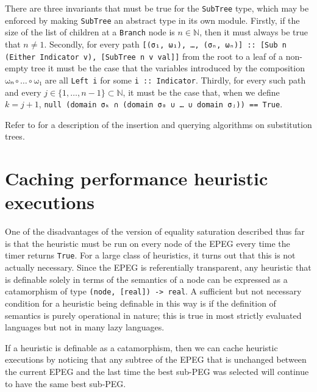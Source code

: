 \documentclass[11pt]{report}
\newcommand{\haskell}[1]{\texttt{#1}}
\newcommand{\mbb}[1]{\ensuremath{\mathbb{#1}}}     %
\newcommand{\sfixme}[0]{%
  \begin{minipage}[c]{3.5em}%
  \todo[color=green!40,inline]{\textsc{fixme}}%
  \end{minipage}}
\newcommand{\comp}[0]{\circ}
\begin{document}
There are three invariants that must be true for the \haskell{SubTree} type,
which may be enforced by making \haskell{SubTree} an abstract type in its own
module. Firstly, if the size of the list of children at a \haskell{Branch} node
is $n \in \mbb{N}$, then it must always be true that $n \neq 1$. Secondly, for
every path
\texttt{[(\haskell{σ₁}, \haskell{ω₁}), …, (\haskell{σₙ}, \haskell{ωₙ})] \haskell{::} \haskell{[Sub n (Either Indicator v), [SubTree n v val]]}}
from the root to a leaf of a non-empty tree it must be the case that the
variables introduced by the composition $\haskell{ωₙ} \comp \ldots \comp \haskell{ω₁}$ are
all \texttt{\haskell{Left} \haskell{i}} for some \haskell{i :: Indicator}.
Thirdly, for every such path and every $j \in \{1, \ldots, n - 1\} \subset \mbb{N}$,
it must be the case that, when we define $k = j + 1$,
\texttt{\haskell{null} (\haskell{domain} \haskell{σₖ} ∩ (\haskell{domain} \haskell{σ₀} ∪ … ∪ \haskell{domain} \haskell{σⱼ})) \haskell{==} \haskell{True}}.

Refer to \cite{graf-1994} for a description of the insertion and querying
algorithms on substitution trees.


\section{Caching performance heuristic executions}
\label{sec:heuristic-caching}

One of the disadvantages of the version of equality saturation described
thus far is that the heuristic must be run on every node of the EPEG
every time the timer returns \haskell{True}. For a large class of heuristics,
it turns out that this is not actually necessary. Since the EPEG is
referentially transparent, any heuristic that is definable solely in terms of
the semantics of a node can be expressed as a catamorphism of type
\haskell{(node, [real]) -> real}. A sufficient but not necessary condition for
a heuristic being definable in this way is if the definition of semantics is
purely operational in nature; this is true in most strictly evaluated languages
but not in many lazy languages.

If a heuristic is definable as a catamorphism, then we can cache heuristic
executions by noticing that any subtree of the EPEG that is unchanged between
the current EPEG and the last time the best sub-PEG was selected will continue
to have the same best sub-PEG.
\end{document}
